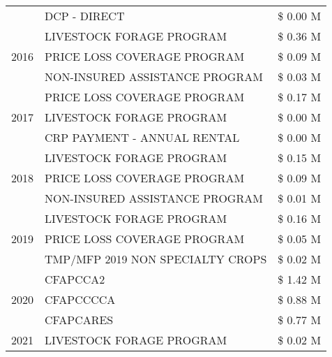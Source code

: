 \begin{tabular}{llr}
 & DCP - DIRECT & \$ 0.00 M \\
\cline{1-3}
\multirow[t]{3}{*}{2016} & LIVESTOCK FORAGE PROGRAM & \$ 0.36 M \\
 & PRICE LOSS COVERAGE PROGRAM & \$ 0.09 M \\
 & NON-INSURED ASSISTANCE PROGRAM & \$ 0.03 M \\
\cline{1-3}
\multirow[t]{3}{*}{2017} & PRICE LOSS COVERAGE PROGRAM & \$ 0.17 M \\
 & LIVESTOCK FORAGE PROGRAM & \$ 0.00 M \\
 & CRP PAYMENT - ANNUAL RENTAL & \$ 0.00 M \\
\cline{1-3}
\multirow[t]{3}{*}{2018} & LIVESTOCK FORAGE PROGRAM & \$ 0.15 M \\
 & PRICE LOSS COVERAGE PROGRAM & \$ 0.09 M \\
 & NON-INSURED ASSISTANCE PROGRAM & \$ 0.01 M \\
\cline{1-3}
\multirow[t]{3}{*}{2019} & LIVESTOCK FORAGE PROGRAM & \$ 0.16 M \\
 & PRICE LOSS COVERAGE PROGRAM & \$ 0.05 M \\
 & TMP/MFP 2019 NON SPECIALTY CROPS & \$ 0.02 M \\
\cline{1-3}
\multirow[t]{3}{*}{2020} & CFAPCCA2 & \$ 1.42 M \\
 & CFAPCCCCA & \$ 0.88 M \\
 & CFAPCARES & \$ 0.77 M \\
\cline{1-3}
2021 & LIVESTOCK FORAGE PROGRAM & \$ 0.02 M \\
\cline{1-3}
\bottomrule
\end{tabular}
